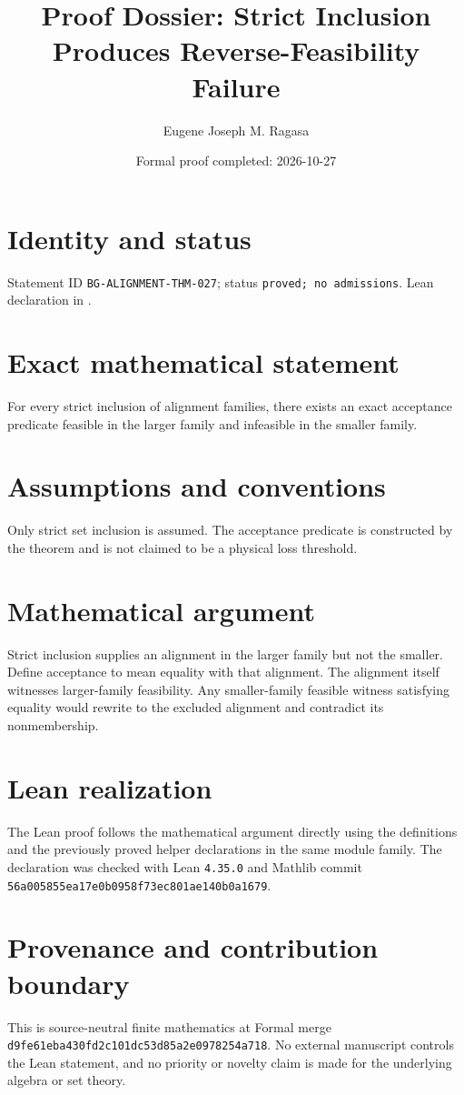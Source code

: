 \documentclass[11pt]{article}
\title{Proof Dossier: Strict Inclusion Produces Reverse-Feasibility Failure}
\author{Eugene Joseph M. Ragasa}
\date{Formal proof completed: 2026-10-27}
\begin{document}
\raggedright
\maketitle

\section{Identity and status}
Statement ID \texttt{BG-ALIGNMENT-THM-027}; status \texttt{proved; no admissions}.  Lean declaration
 in
.

\section{Exact mathematical statement}
For every strict inclusion of alignment families, there exists an exact acceptance predicate feasible in the larger family and infeasible in the smaller family.

\section{Assumptions and conventions}
Only strict set inclusion is assumed.  The acceptance predicate is constructed by the theorem and is not claimed to be a physical loss threshold.

\section{Mathematical argument}
Strict inclusion supplies an alignment in the larger family but not the smaller.  Define acceptance to mean equality with that alignment.  The alignment itself witnesses larger-family feasibility.  Any smaller-family feasible witness satisfying equality would rewrite to the excluded alignment and contradict its nonmembership.

\section{Lean realization}
The Lean proof follows the mathematical argument directly using the definitions and the
previously proved helper declarations in the same module family.  The declaration was checked
with Lean \texttt{4.35.0} and Mathlib commit \texttt{56a005855ea17e0b0958f73ec801ae140b0a1679}.

\section{Provenance and contribution boundary}
This is source-neutral finite mathematics at Formal merge
\texttt{d9fe61eba430fd2c101dc53d85a2e0978254a718}.  No external manuscript controls the Lean statement, and no priority or
novelty claim is made for the underlying algebra or set theory.
\end{document}
